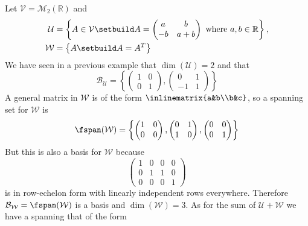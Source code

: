 \begin{exm}
	Let $\mathcal{V}=\mathcal{M}_2(\mathbb{R})$ and
	\begin{align*}
		\mathcal{U} & =\left\{A\in\mathcal{V}\setbuild A=\begin{pmatrix}
			a  & b   \\
			-b & a+b
		\end{pmatrix}\text{ where }a,b\in\mathbb{R}\right\}, \\
		\mathcal{W} & =\left\{A\setbuild A=A^T\right\}
	\end{align*}
	We have seen in a previous example that $\dim(\mathcal{U})=2$ and that
	\begin{equation*}
		\mathcal{B}_\mathcal{U}=\left\{\begin{pmatrix}1&0\\0&1\end{pmatrix},
		\begin{pmatrix}0&1\\-1&1\end{pmatrix}\right\}
	\end{equation*}
	A general matrix in $\mathcal{W}$ is of the form $\inlinematrix{a&b\\b&c}$,
	so a spanning set for $\mathcal{W}$ is
	\begin{equation*}
		\fspan(\mathcal{W})=\left\{
		\begin{pmatrix}
			1 & 0 \\
			0 & 0
		\end{pmatrix},
		\begin{pmatrix}
			0 & 1 \\
			1 & 0
		\end{pmatrix},
		\begin{pmatrix}
			0 & 0 \\
			0 & 1
		\end{pmatrix}
		\right\}
	\end{equation*}
	But this is also a basis for $\mathcal{W}$ because
	\begin{equation*}
		\begin{pmatrix}
			1 & 0 & 0 & 0 \\
			0 & 1 & 1 & 0 \\
			0 & 0 & 0 & 1
		\end{pmatrix}
	\end{equation*}
	is in row-echelon form with linearly independent rows everywhere. Therefore
	$\mathcal{B}_\mathcal{W}=\fspan(\mathcal{W})$ is a basis and $\dim(\mathcal{W})=3$.
	As for the sum of $\mathcal{U}+\mathcal{W}$ we have a spanning that of the form

\end{exm}
